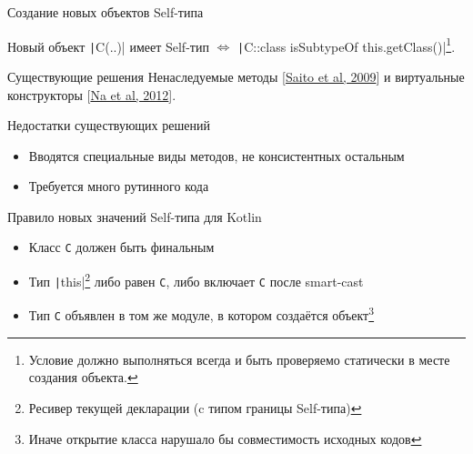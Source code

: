 \documentclass[handout,aspectratio=169,usenames,dvipsnames]{beamer}
\begin{document}
    \begin{frame}[fragile]{Создание новых объектов Self-типа}


        Новый объект \texttt|C(..)| имеет Self-тип $\iff$ \texttt|C::class isSubtypeOf this.getClass()|\footnote{Условие должно выполняться всегда и быть проверяемо статически в месте создания объекта.}.

        \pause

        \begin{block}{Существующие решения}
            Ненаследуемые методы [\href{http://www.fos.kuis.kyoto-u.ac.jp/~igarashi/papers/pdf/thistype-SAC09.pdf}{Saito et al, 2009}] и виртуальные конструкторы [\href{https://www.researchgate.net/profile/Sukyoung-Ryu/publication/254004584_Exact_type_parameterization_and_ThisType_support/links/54b90ed10cf269d8cbf72d01/Exact-type-parameterization-and-ThisType-support.pdf}{Na et al, 2012}].
        \end{block}

        \begin{block}{Недостатки существующих решений}
            \begin{itemize}
                \item Вводятся специальные виды методов, не консистентных остальным
                \item Требуется много рутинного кода
            \end{itemize}
        \end{block}

        \pause

        \begin{block}{Правило новых значений Self-типа для Kotlin}
            \begin{itemize}
                \item Класс \texttt{C} должен быть финальным
                \item Тип \texttt|this|\footnote{Ресивер текущей декларации (c типом границы Self-типа)} либо равен \texttt{С}, либо включает \texttt{C} после smart-cast
                \item Тип \texttt{C} объявлен в том же модуле, в котором создаётся объект\footnote{Иначе открытие класса нарушало бы совместимость исходных кодов}
            \end{itemize}
        \end{block}
    \end{frame}
\end{document}
